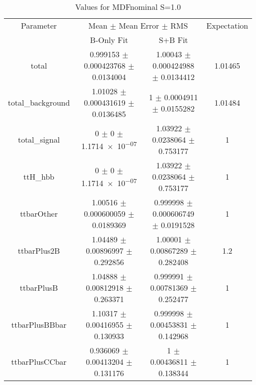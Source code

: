 \begin{table}
\centering
\caption{Values for MDFnominal S=1.0}
\begin{tabular}{cccc}
\toprule
Parameter & \multicolumn{2}{c}{Mean $\pm$ Mean Error $\pm$ RMS} & Expectation\\
 & B-Only Fit & S+B Fit & \\
\midrule
total & \num{0.999153} $\pm$ \num{0.000423768} $\pm$ \num{0.0134004} & \num{1.00043} $\pm$ \num{0.000424988} $\pm$ \num{0.0134412} & \num{1.01465}\\
total\_background & \num{1.01028} $\pm$ \num{0.000431619} $\pm$ \num{0.0136485} & \num{1} $\pm$ \num{0.0004911} $\pm$ \num{0.0155282} & \num{1.01484}\\
total\_signal & \num{0} $\pm$ \num{0} $\pm$ \num{1.1714e-07} & \num{1.03922} $\pm$ \num{0.0238064} $\pm$ \num{0.753177} & \num{1}\\
ttH\_hbb & \num{0} $\pm$ \num{0} $\pm$ \num{1.1714e-07} & \num{1.03922} $\pm$ \num{0.0238064} $\pm$ \num{0.753177} & \num{1}\\
ttbarOther & \num{1.00516} $\pm$ \num{0.000600059} $\pm$ \num{0.0189369} & \num{0.999998} $\pm$ \num{0.000606749} $\pm$ \num{0.0191528} & \num{1}\\
ttbarPlus2B & \num{1.04489} $\pm$ \num{0.00896997} $\pm$ \num{0.292856} & \num{1.00001} $\pm$ \num{0.00867289} $\pm$ \num{0.282408} & \num{1.2}\\
ttbarPlusB & \num{1.04888} $\pm$ \num{0.00812918} $\pm$ \num{0.263371} & \num{0.999991} $\pm$ \num{0.00781369} $\pm$ \num{0.252477} & \num{1}\\
ttbarPlusBBbar & \num{1.10317} $\pm$ \num{0.00416955} $\pm$ \num{0.130933} & \num{0.999998} $\pm$ \num{0.00453831} $\pm$ \num{0.142968} & \num{1}\\
ttbarPlusCCbar & \num{0.936069} $\pm$ \num{0.00413204} $\pm$ \num{0.131176} & \num{1} $\pm$ \num{0.00436811} $\pm$ \num{0.138344} & \num{1}\\
\bottomrule
\end{tabular}
\end{table}